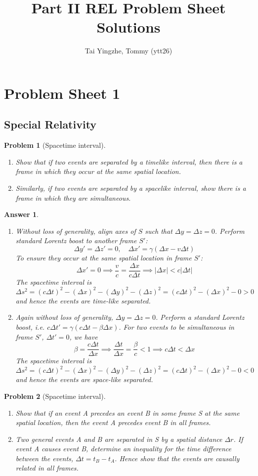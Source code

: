 \documentclass[a4paper]{article}
\title{\textbf{Part II REL Problem Sheet Solutions}}
\author{Tai Yingzhe, Tommy (ytt26)}
\date{}
\newtheorem{ans}{Answer}[subsection]
\theoremstyle{new}
\newtheorem{qns}{Problem}[section]
\begin{document}
\maketitle
\tableofcontents
\newpage
\section{Problem Sheet 1}
\subsection*{Special Relativity}
\begin{qns}[Spacetime interval]\leavevmode
\begin{enumerate}[label=(\alph*)]
\item Show that if two events are separated by a timelike interval, then there is a frame in which they occur at the same spatial location.
\item Similarly, if two events are separated by a spacelike interval, show there is a frame in which they are simultaneous.
\end{enumerate}
\end{qns}
\begin{ans}\leavevmode
\begin{enumerate}[label=(\alph*)]
\item Without loss of generality, align axes of $S$ such that $\Delta y=\Delta z=0$. Perform standard Lorentz boost to another frame $S'$:
$$\Delta y'=\Delta z'=0,\quad\Delta x'=\gamma(\Delta x-v\Delta t)$$
To ensure they occur at the same spatial location in frame $S'$:
$$\Delta x'=0\implies\frac{v}{c}=\frac{\Delta x}{c\Delta t}\implies|\Delta x|<c|\Delta t|$$
The spacetime interval is
$$\Delta s^2=(c\Delta t)^2-(\Delta x)^2-(\Delta y)^2-(\Delta z)^2=(c\Delta t)^2-(\Delta x)^2-0>0$$
and hence the events are time-like separated.
\item Again without loss of generality, $\Delta y=\Delta z=0$. Perform a standard Lorentz boost, i.e. $c\Delta t'=\gamma(c\Delta t-\beta\Delta x)$. For two events to be simultaneous in frame $S'$, $\Delta t'=0$, we have $$\beta=\frac{c\Delta t}{\Delta x}\implies\frac{\Delta t}{\Delta x}=\frac{\beta}{c}<1\implies c\Delta t<\Delta x$$
The spacetime interval is
$$\Delta s^2=(c\Delta t)^2-(\Delta x)^2-(\Delta y)^2-(\Delta z)^2=(c\Delta t)^2-(\Delta x)^2-0<0$$
and hence the events are space-like separated.
\end{enumerate}
\end{ans}
\begin{qns}[Spacetime interval]\leavevmode
\begin{enumerate}[label=(\alph*)]
\item Show that if an event A precedes an event B in some frame S at the same spatial location, then the event A precedes event B in all frames. 
\item Two general events A and B are separated in S by a spatial distance $\Delta r$. If event A causes event B, determine an inequality for the time difference between the events, $\Delta t=t_B-t_A$. Hence show that the events are causally related in all frames.
\end{enumerate}
\end{qns}
\end{document}
